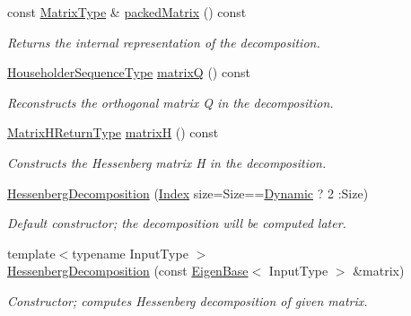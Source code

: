 \begin{DoxyCompactItemize}
const \hyperlink{group___eigenvalues___module_a93a611350a7db9d1da18f2c828ecea9f}{Matrix\+Type} \& \hyperlink{group___eigenvalues___module_a1f72b7612fd4edc5a6f31005e433e1dd}{packed\+Matrix} () const
\begin{DoxyCompactList}\small\item\em Returns the internal representation of the decomposition. \end{DoxyCompactList}\item 
\hyperlink{group___eigenvalues___module_a7c1188cd5d8f550c8941df75a50a7d08}{Householder\+Sequence\+Type} \hyperlink{group___eigenvalues___module_a346441e4902a58d43d698ac3da6ff791}{matrixQ} () const
\begin{DoxyCompactList}\small\item\em Reconstructs the orthogonal matrix Q in the decomposition. \end{DoxyCompactList}\item 
\hyperlink{group___eigenvalues___module_struct_eigen_1_1internal_1_1_hessenberg_decomposition_matrix_h_return_type}{Matrix\+H\+Return\+Type} \hyperlink{group___eigenvalues___module_a8e781d2e22a2304647bcf0ae913cc8ea}{matrixH} () const
\begin{DoxyCompactList}\small\item\em Constructs the Hessenberg matrix H in the decomposition. \end{DoxyCompactList}\item 
\hyperlink{group___eigenvalues___module_aee1724cb6418ede1a8b9045036a5a319}{Hessenberg\+Decomposition} (\hyperlink{group___eigenvalues___module_a8e287ac222f53e2c8ce82faa43e95ac6}{Index} size=Size==\hyperlink{namespace_eigen_ad81fa7195215a0ce30017dfac309f0b2}{Dynamic} ? 2 \+:Size)
\begin{DoxyCompactList}\small\item\em Default constructor; the decomposition will be computed later. \end{DoxyCompactList}\item 
{\footnotesize template$<$typename Input\+Type $>$ }\\\hyperlink{group___eigenvalues___module_acd22602a3e3e5a02f79990ba1e445dc9}{Hessenberg\+Decomposition} (const \hyperlink{group___core___module_struct_eigen_1_1_eigen_base}{Eigen\+Base}$<$ Input\+Type $>$ \&matrix)
\begin{DoxyCompactList}\small\item\em Constructor; computes Hessenberg decomposition of given matrix. \end{DoxyCompactList}\item 

\end{DoxyCompactItemize}
